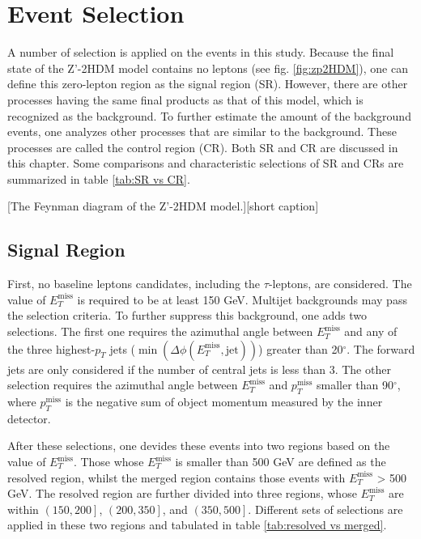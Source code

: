 \documentclass[class=NCU_thesis, crop=false]{standalone}
\begin{document}
\chapter{Event Selection}\label{Event selection}
A number of selection is applied on the events in this study. Because the final state of the Z'-2HDM model contains no leptons (see fig. \ref{fig:zp2HDM}), one can define this zero-lepton region as the signal region (SR). However, there are other processes having the same final products as that of this model, which is recognized as the background. To further estimate the amount of the background events, one analyzes other processes that are similar to the background. These processes are called the control region (CR). Both SR and CR are discussed in this chapter. Some comparisons and characteristic selections of SR and CRs are summarized in table \ref{tab:SR vs CR}.

[The Feynman diagram of the Z'-2HDM model.][short caption]

\section{Signal Region}\label{SR}
	First, no baseline leptons candidates, including the $\tau$-leptons, are considered. The value of $E_T^{\mathrm{miss}}$ is required to be at least 150 GeV. Multijet backgrounds may pass the selection criteria. To further suppress this background, one adds two selections. The first one requires the azimuthal angle between $E_T^{\mathrm{miss}}$ and any of the three highest-$p_T$ jets ($\min(\Delta \phi(E_T^{\mathrm{miss}}, \mathrm{jet}))$) greater than 20$^\circ$. The forward jets are only considered if the number of central jets is less than 3. The other selection requires the azimuthal angle between $E_T^{\mathrm{miss}}$ and $p_T^{\mathrm{miss}}$ smaller than 90$^\circ$, where $p_T^{\mathrm{miss}}$ is the negative sum of object momentum measured by the inner detector.

	After these selections, one devides these events into two regions based on the value of $E_T^{\mathrm{miss}}$. Those whose $E_T^{\mathrm{miss}}$ is smaller than 500 GeV are defined as the resolved region, whilst the merged region contains those events with $E_T^{\mathrm{miss}}$ > 500 GeV. The resolved region are further divided into three regions, whose $E_T^{\mathrm{miss}}$ are within $\left(150, 200\right]$, $\left(200, 350\right]$, and $\left(350, 500\right]$. Different sets of selections are applied in these two regions and tabulated in table \ref{tab:resolved vs merged}.
\end{document}
